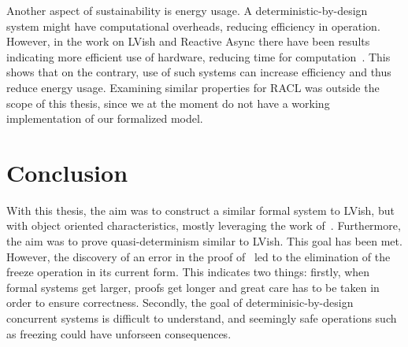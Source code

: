 Another aspect of sustainability is energy usage. A deterministic-by-design
system might have computational overheads, reducing efficiency in operation.
However, in the work on LVish and Reactive Async there have been results
indicating more efficient use of hardware, reducing time for
computation~\parencite{kuper2014freeze,conf/scala/HallerGES16}. This shows that
on the contrary, use of such systems can increase efficiency and thus reduce
energy usage. Examining similar properties for RACL was outside the
scope of this thesis, since we at the moment do not have a working
implementation of our formalized model. 
%

\section{Conclusion}%
\label{sec:conclusion}

With this thesis, the aim was to construct a similar formal system to LVish, but
with object oriented characteristics, mostly leveraging the work
of~\textcite{conf/oopsla/HallerL16}. Furthermore, the aim was to prove
quasi-determinism similar to LVish. This goal has been met.  However, the
discovery of an error in the proof of~\textcite{kuper2014freezeTR} led to the
elimination of the freeze operation in its current form. This indicates two
things: firstly, when formal systems get larger, proofs get longer and great
care has to be taken in order to ensure correctness. Secondly, the goal of
determinisic-by-design concurrent systems is difficult to understand, and
seemingly safe operations such as freezing could have unforseen consequences.





